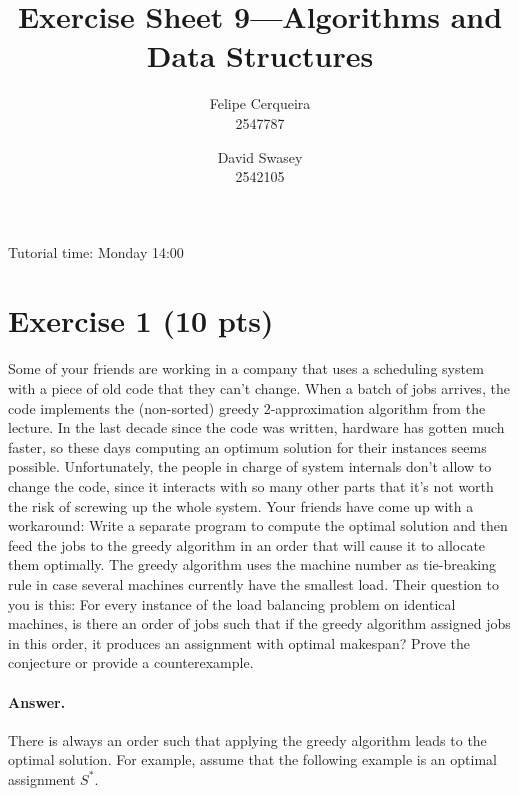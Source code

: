 \documentclass[a4paper]{article}
\title{Exercise Sheet 9---Algorithms and Data Structures}
\author{Felipe Cerqueira \\ 2547787 \and David Swasey \\ 2542105}
\begin{document}
\maketitle

Tutorial time: Monday 14:00



\section*{Exercise 1 (10 pts)}

Some of your friends are working in a company that uses a scheduling system with a piece of old code that they can't change. When a batch of jobs arrives, the code implements the (non-sorted) greedy 2-approximation algorithm from the lecture. In the last decade since the code was written, hardware has gotten much faster, so these days computing an optimum solution for their instances seems possible. Unfortunately, the people in charge of system internals don’t allow to change the code, since it interacts with so many other parts that it’s not worth the risk of screwing up the whole system.
Your friends have come up with a workaround: Write a separate program to compute the optimal solution and then feed the jobs to the greedy algorithm in an order that will cause it to allocate them optimally. The greedy algorithm uses the machine number as tie-breaking rule in case several machines currently have the smallest load. Their question to you is this: For every instance of the load balancing problem on identical machines, is there an order of jobs such that if the greedy algorithm assigned jobs in this order, it produces an assignment with optimal makespan?
Prove the conjecture or provide a counterexample.

\paragraph{Answer.}

There is always an order such that applying the greedy algorithm leads to the optimal solution.
For example, assume that the following example is an optimal assignment $S^\ast$. 
\end{document}
